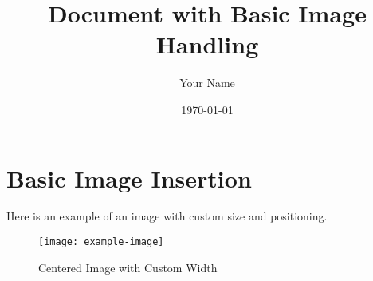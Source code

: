 \documentclass[11pt,a4paper]{article}
\title{Document with Basic Image Handling}
\author{Your Name}
\date{\today}
\begin{document}
\maketitle

\section{Basic Image Insertion}
Here is an example of an image with custom size and positioning.

\begin{figure}[H]
  \centering
  \texttt{[image: example-image]}
  \caption{Centered Image with Custom Width}
  \label{fig:centeredimage}
\end{figure}
\end{document}
